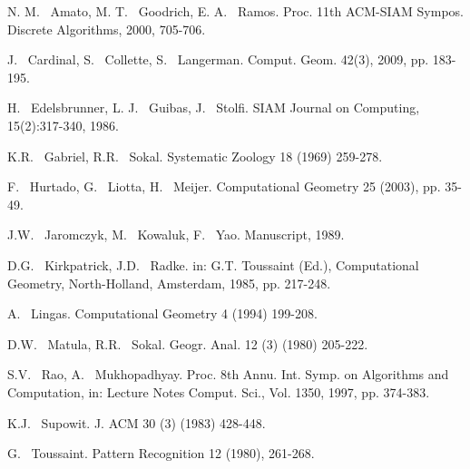\documentclass[10pt]{article}
\begin{document}
\begin{thebibliography}{99}


N. M. ~Amato, M. T. ~Goodrich, E. A. ~Ramos. 
\newblock Proc. 11th ACM-SIAM Sympos. Discrete Algorithms, 2000, 705-706. 

J. ~Cardinal, S. ~Collette, S. ~Langerman. 
\newblock Comput. Geom. 42(3), 2009, pp. 183-195. 

H. ~Edelsbrunner, L. J. ~Guibas, J. ~Stolfi. 
\newblock SIAM Journal on Computing, 15(2):317-340, 1986. 

K.R. ~Gabriel, R.R. ~Sokal. 
\newblock Systematic Zoology 18 (1969) 259-278. 

F. ~Hurtado, G. ~Liotta, H. ~Meijer. 
\newblock Computational Geometry 25 (2003), pp. 35-49. 

J.W. ~Jaromczyk, M. ~Kowaluk, F. ~Yao. 
\newblock Manuscript, 1989. 

D.G. ~Kirkpatrick, J.D. ~Radke. 
\newblock in: G.T. Toussaint (Ed.), Computational Geometry, North-Holland, Amsterdam, 1985, pp. 217-248. 

A. ~Lingas. 
\newblock Computational Geometry 4 (1994) 199-208. 

D.W. ~Matula, R.R. ~Sokal. 
\newblock Geogr. Anal. 12 (3) (1980) 205-222. 

S.V. ~Rao, A. ~Mukhopadhyay. 
\newblock Proc. 8th Annu. Int. Symp. on Algorithms and Computation, in: Lecture Notes Comput. Sci., 
Vol. 1350, 1997, pp. 374-383. 

K.J. ~Supowit. 
\newblock J. ACM 30 (3) (1983) 428-448. 

G. ~Toussaint. 
\newblock Pattern Recognition 12 (1980), 261-268. 

\end{thebibliography}
\end{document}

